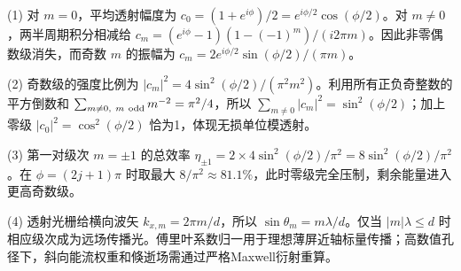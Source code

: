(1) 对 \(m=0\)，平均透射幅度为 \(c_0=(1+e^{i\phi})/2=e^{i\phi/2}\cos(\phi/2)\)。对 \(m\ne0\)，两半周期积分相减给 \(c_m=(e^{i\phi}-1)(1-(-1)^m)/(i2\pi m)\)。因此非零偶数级消失，而奇数 \(m\) 的振幅为 \(c_m=2e^{i\phi/2}\sin(\phi/2)/(\pi m)\)。

(2) 奇数级的强度比例为 \(|c_m|^2=4\sin^2(\phi/2)/(\pi^2m^2)\)。利用所有正负奇整数的平方倒数和 \(\sum_{m\ne0,\ m\ \rm odd}m^{-2}=\pi^2/4\)，所以 \(\sum_{m\ne0}|c_m|^2=\sin^2(\phi/2)\)；加上零级 \(|c_0|^2=\cos^2(\phi/2)\) 恰为1，体现无损单位模透射。

(3) 第一对级次 \(m=\pm1\) 的总效率 \(\eta_{\pm1}=2\times4\sin^2(\phi/2)/\pi^2=8\sin^2(\phi/2)/\pi^2\)。在 \(\phi=(2j+1)\pi\) 时取最大 \(8/\pi^2\approx81.1\%\)，此时零级完全压制，剩余能量进入更高奇数级。

(4) 透射光栅给横向波矢 \(k_{x,m}=2\pi m/d\)，所以 \(\sin\theta_m=m\lambda/d\)。仅当 \(|m|\lambda\le d\) 时相应级次成为远场传播光。傅里叶系数归一用于理想薄屏近轴标量传播；高数值孔径下，斜向能流权重和倏逝场需通过严格Maxwell衍射重算。
